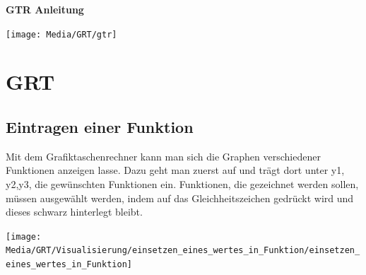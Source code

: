 \begin{center}
	\vspace*{3cm} %
{\Huge\bfseries GTR Anleitung\par} %
\vspace{1.5cm}
\texttt{[image: Media/GRT/gtr]}
\pagebreak
\end{center}
\section{GRT}\label{sec:GTR}
\subsection{Eintragen einer Funktion}\label{sec:Eintragen einer Funktion}
\begin{paracol}{2}
\begin{flushleft}
Mit dem Grafiktaschenrechner kann man sich die Graphen verschiedener Funktionen anzeigen lasse. Dazu geht man zuerst auf und trägt dort unter  y1, y2,y3, die gewünschten Funktionen ein. Funktionen, die gezeichnet werden sollen, müssen ausgewählt werden, indem auf das Gleichheitszeichen gedrückt wird und dieses schwarz hinterlegt bleibt. 

\end{flushleft}	
\switchcolumn
\begin{flushright}
\texttt{[image: Media/GRT/Visualisierung/einsetzen\_eines\_wertes\_in\_Funktion/einsetzen\_eines\_wertes\_in\_Funktion]}
\end{flushright}
\end{paracol}


